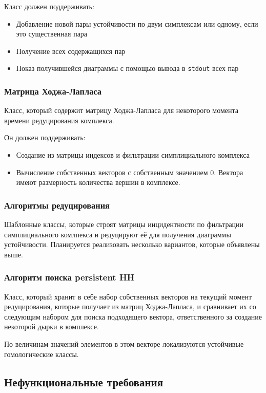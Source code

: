 \documentclass{article}
\begin{document}
Класс должен поддерживать:
\begin{itemize}
  \item Добавление новой пары устойчивости по двум симплексам или одному, если это существенная пара
  \item Получение всех содержащихся пар
  \item Показ получившейся диаграммы с помощью вывода в \verb"stdout" всех пар
\end{itemize}
\subsubsection{Матрица Ходжа-Лапласа}
Класс, который содержит матрицу Ходжа-Лапласа для некоторого момента времени редуцирования комплекса.

Он должен поддерживать:
\begin{itemize}
  \item Создание из матрицы индексов и фильтрации симплициального комплекса
  \item Вычисление собственных векторов с собственным значением 0. Вектора имеют размерность количества вершин в комплексе.
\end{itemize}
\subsubsection{Алгоритмы редуцирования}
Шаблонные классы, которые строят матрицы инцидентности по фильтрации симплициального комлпекса и редуцируют её для получения диаграммы устойчивости. Планируется реализовать несколько вариантов, которые объявлены выше.
\subsubsection{Алгоритм поиска persistent HH}
Класс, который хранит в себе набор собственных векторов на текущий момент редуцирования, которые получает из матриц Ходжа-Лапласа, и сравнивает их со следующим набором для поиска подходящего вектора, ответственного за создание некоторой дырки в комплексе.

По величинам значений элементов в этом векторе локализуются устойчивые гомологические классы. \cite{laplacianmatrix}
\subsection{Нефункциональные требования}
\end{document}
